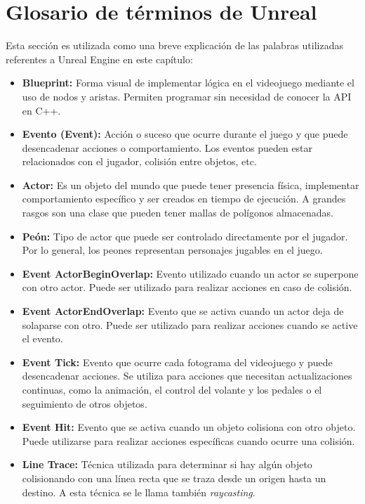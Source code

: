\section{Glosario de términos de Unreal}
\label{sec:terminosunreal}
Esta sección es utilizada como una breve explicación de las palabras utilizadas referentes a Unreal Engine en este capítulo:

\begin{itemize}
    \item \textbf{Blueprint: }Forma visual de implementar lógica en el videojuego mediante el uso de nodos y aristas. Permiten programar sin necesidad de conocer la API en C++.
    \item \textbf{Evento (Event): }Acción o suceso que ocurre durante el juego y que puede desencadenar acciones o comportamiento. Los eventos pueden estar relacionados con el jugador, colisión entre objetos, etc.
    \item \textbf{Actor: }Es un objeto del mundo que puede tener presencia física, implementar comportamiento específico y ser creados en tiempo de ejecución. A grandes rasgos son una clase que pueden tener mallas de polígonos almacenadas.
    \item \textbf{Peón: }Tipo de actor que puede ser controlado directamente por el jugador. Por lo general, los peones representan personajes jugables en el juego.
    \item \textbf{Event ActorBeginOverlap: }Evento utilizado cuando un actor se superpone con otro actor. Puede ser utilizado para realizar acciones en caso de colisión.
    \item \textbf{Event ActorEndOverlap: }Evento que se activa cuando un actor deja de solaparse con otro. Puede ser utilizado para realizar acciones cuando se active el evento.
    \item \textbf{Event Tick: }Evento que ocurre cada fotograma del videojuego y puede desencadenar acciones. Se utiliza para acciones que necesitan actualizaciones continuas, como la animación, el control del volante y los pedales o el seguimiento de otros objetos.
    \item \textbf{Event Hit: }Evento que se activa cuando un objeto colisiona con otro objeto. Puede utilizarse para realizar acciones específicas cuando ocurre una colisión.
    \item \textbf{Line Trace: }Técnica utilizada para determinar si hay algún objeto colisionando con una línea recta que se traza desde un origen hasta un destino. A esta técnica se le llama también \textit{raycasting}.
\end{itemize}

